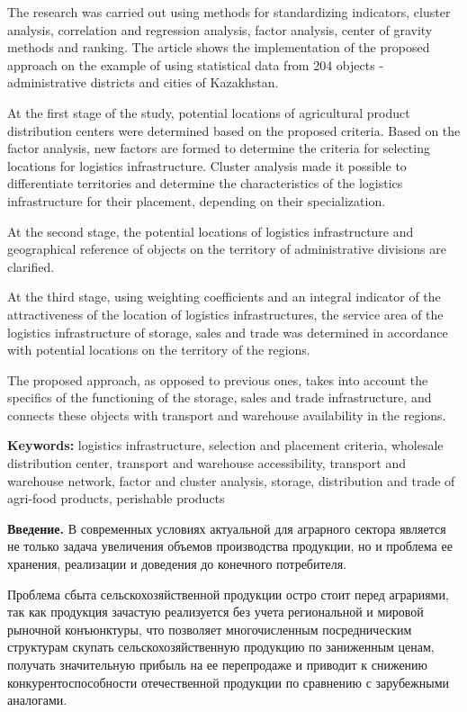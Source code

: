 The research was carried out using methods for standardizing indicators,
cluster analysis, correlation and regression analysis, factor analysis,
center of gravity methods and ranking. The article shows the
implementation of the proposed approach on the example of using
statistical data from 204 objects - administrative districts and cities
of Kazakhstan.

At the first stage of the study, potential locations of agricultural
product distribution centers were determined based on the proposed
criteria. Based on the factor analysis, new factors are formed to
determine the criteria for selecting locations for logistics
infrastructure. Cluster analysis made it possible to differentiate
territories and determine the characteristics of the logistics
infrastructure for their placement, depending on their specialization.

At the second stage, the potential locations of logistics infrastructure
and geographical reference of objects on the territory of administrative
divisions are clarified.

At the third stage, using weighting coefficients and an integral
indicator of the attractiveness of the location of logistics
infrastructures, the service area of the logistics infrastructure of
storage, sales and trade was determined in accordance with potential
locations on the territory of the regions.

The proposed approach, as opposed to previous ones, takes into account
the specifics of the functioning of the storage, sales and trade
infrastructure, and connects these objects with transport and warehouse
availability in the regions.

{\bfseries Keywords:} logistics infrastructure, selection and placement
criteria, wholesale distribution center, transport and warehouse
accessibility, transport and warehouse network, factor and cluster
analysis, storage, distribution and trade of agri-food products,
perishable products

{\bfseries Введение.} В современных условиях актуальной для аграрного
сектора является не только задача увеличения объемов производства
продукции, но и проблема ее хранения, реализации и доведения до
конечного потребителя.

Проблема сбыта сельскохозяйственной продукции остро стоит перед
аграриями, так как продукция зачастую реализуется без учета региональной
и мировой рыночной конъюнктуры, что позволяет многочисленным
посредническим структурам скупать сельскохозяйственную продукцию по
заниженным ценам, получать значительную прибыль на ее перепродаже и
приводит к снижению конкурентоспособности отечественной продукции по
сравнению с зарубежными аналогами.

